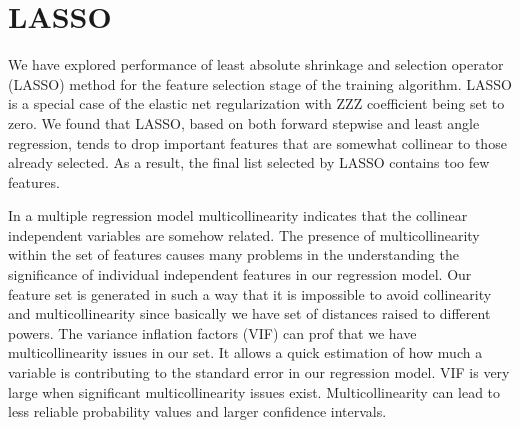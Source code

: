 \documentclass[aip,jcp,reprint,amsmath,amssymb,nature]{revtex4-1}
\begin{document}


\section{LASSO} 

We have explored performance of least absolute 
shrinkage and selection operator (LASSO) method for the feature 
selection stage of the training algorithm. LASSO is a special case of 
the elastic net regularization with ZZZ coefficient being set to zero. 
We found that LASSO, based on both forward stepwise and least angle 
regression, tends to drop important features that are somewhat collinear 
to those already selected. As a result, the final list selected by LASSO 
contains too few features.

In a multiple regression model multicollinearity indicates that the 
collinear independent variables are somehow related. The presence of 
multicollinearity within the set of features causes many problems in the 
understanding the significance of individual independent features in our 
regression model. Our feature set is generated in such a way that it is 
impossible to avoid collinearity and multicollinearity since basically 
we have set of distances raised to different powers. The variance 
inflation factors (VIF) can prof that we have multicollinearity issues 
in our set. It allows a quick estimation of how much a variable is 
contributing to the standard error in our regression model. VIF is very 
large when significant multicollinearity issues exist. Multicollinearity 
can lead to less reliable probability values and larger confidence 
intervals.
\end{document}
